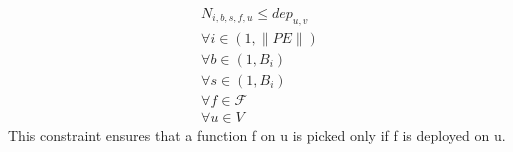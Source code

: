 \documentclass[journal]{IEEEtran}
\begin{document}
\begin{equation}
\begin{split}
    N_{i,b,s,f,u} \leq dep_{u,v}\\
    \forall i \in (1,\lVert PE \rVert)\\
    \forall b \in (1,B_i)\\
    \forall s \in (1,B_i) \\
    \forall f \in \mathcal{F} \\
    \forall u \in V
\end{split}
\end{equation}
This constraint ensures that a function f on u is picked only if f is deployed on u.


\end{document}
